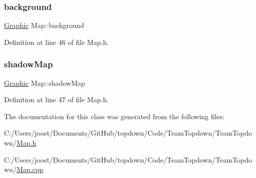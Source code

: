 \subsubsection{\texorpdfstring{background}{background}}
{\footnotesize\ttfamily \hyperlink{class_graphic}{Graphic} Map\+::background}



Definition at line 46 of file Map.\+h.

\mbox{\label{class_map_a444d10c1cf7a759976a72dcec8908e62}} 
\subsubsection{\texorpdfstring{shadow\+Map}{shadowMap}}
{\footnotesize\ttfamily \hyperlink{class_graphic}{Graphic} Map\+::shadow\+Map}



Definition at line 47 of file Map.\+h.



The documentation for this class was generated from the following files\+:\begin{DoxyCompactItemize}
\item 
C\+:/\+Users/joost/\+Documents/\+Git\+Hub/topdown/\+Code/\+Team\+Topdown/\+Team\+Topdown/\hyperlink{_map_8h}{Map.\+h}\item 
C\+:/\+Users/joost/\+Documents/\+Git\+Hub/topdown/\+Code/\+Team\+Topdown/\+Team\+Topdown/\hyperlink{_map_8cpp}{Map.\+cpp}\end{DoxyCompactItemize}
